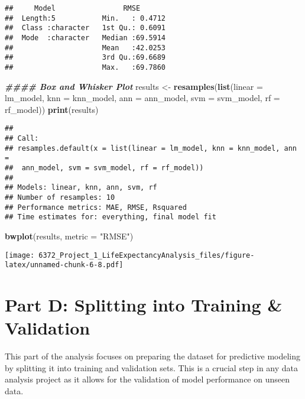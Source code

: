 \documentclass[
]{article}
\newenvironment{Shaded}{\begin{snugshade}}{\end{snugshade}}
\newcommand{\AttributeTok}[1]{\textcolor[rgb]{0.13,0.29,0.53}{#1}}
\newcommand{\DocumentationTok}[1]{\textcolor[rgb]{0.56,0.35,0.01}{\textbf{\textit{#1}}}}
\newcommand{\FunctionTok}[1]{\textcolor[rgb]{0.13,0.29,0.53}{\textbf{#1}}}
\newcommand{\NormalTok}[1]{#1}
\newcommand{\OtherTok}[1]{\textcolor[rgb]{0.56,0.35,0.01}{#1}}
\newcommand{\StringTok}[1]{\textcolor[rgb]{0.31,0.60,0.02}{#1}}
\begin{document}
\begin{verbatim}
##     Model                RMSE        
##  Length:5           Min.   : 0.4712  
##  Class :character   1st Qu.: 0.6091  
##  Mode  :character   Median :69.5914  
##                     Mean   :42.0253  
##                     3rd Qu.:69.6689  
##                     Max.   :69.7860
\end{verbatim}

\begin{Shaded}
\begin{Highlighting}[]
\DocumentationTok{\#\#\#\# Box and Whisker Plot}
\NormalTok{results }\OtherTok{\textless{}{-}} \FunctionTok{resamples}\NormalTok{(}\FunctionTok{list}\NormalTok{(}\AttributeTok{linear =}\NormalTok{ lm\_model, }\AttributeTok{knn =}\NormalTok{ knn\_model, }\AttributeTok{ann =}\NormalTok{ ann\_model, }\AttributeTok{svm =}\NormalTok{ svm\_model, }\AttributeTok{rf =}\NormalTok{ rf\_model))}
\FunctionTok{print}\NormalTok{(results)}
\end{Highlighting}
\end{Shaded}

\begin{verbatim}
## 
## Call:
## resamples.default(x = list(linear = lm_model, knn = knn_model, ann =
##  ann_model, svm = svm_model, rf = rf_model))
## 
## Models: linear, knn, ann, svm, rf 
## Number of resamples: 10 
## Performance metrics: MAE, RMSE, Rsquared 
## Time estimates for: everything, final model fit
\end{verbatim}

\begin{Shaded}
\begin{Highlighting}[]
\FunctionTok{bwplot}\NormalTok{(results, }\AttributeTok{metric =} \StringTok{"RMSE"}\NormalTok{)}
\end{Highlighting}
\end{Shaded}

\texttt{[image: 6372\_Project\_1\_LifeExpectancyAnalysis\_files/figure-latex/unnamed-chunk-6-8.pdf]}

\hypertarget{part-d-splitting-into-training-validation}{%
\section{Part D: Splitting into Training \&
Validation}\label{part-d-splitting-into-training-validation}}

This part of the analysis focuses on preparing the dataset for
predictive modeling by splitting it into training and validation sets.
This is a crucial step in any data analysis project as it allows for the
validation of model performance on unseen data.
\end{document}

